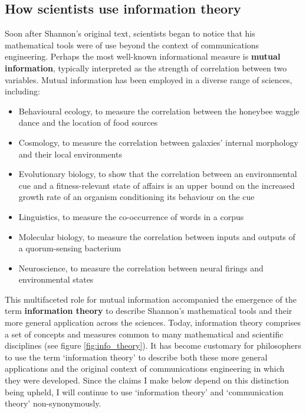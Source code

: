 \documentclass[12pt]{article}
\begin{document}
\subsection{How scientists use information theory}\label{subsec:scientists}

Soon after Shannon's original text, scientists began to notice that his mathematical tools were of use beyond the context of communications engineering.
Perhaps the most well-known informational measure is \textbf{mutual information}, typically interpreted as the strength of correlation between two variables.
Mutual information has been employed in a diverse range of sciences, including:

\begin{itemize}
    \item Behavioural ecology, to measure the correlation between the honeybee waggle dance and the location of food sources \citep{haldane1954statistical}
    \item Cosmology, to measure the correlation between galaxies' internal morphology and their local environments \citep{pandey2017how}
    \item Evolutionary biology, to show that the correlation between an environmental cue and a fitness-relevant state of affairs is an upper bound on the increased growth rate of an organism conditioning its behaviour on the cue \citep{donaldson-matasci2010fitness}
    \item Linguistics, to measure the co-occurrence of words in a corpus \citep[$\S$4]{hunston2002corpora}
    \item Molecular biology, to measure the correlation between inputs and outputs of a quorum-sensing bacterium \citep{mehta2009information}
    \item Neuroscience, to measure the correlation between neural firings and environmental states \citep[][and references therein]{rathkopf2017neural}
\end{itemize}

\noindent This multifaceted role for mutual information accompanied the emergence of the term \textbf{information theory} to describe Shannon's mathematical tools and their more general application across the sciences.
Today, information theory comprises a set of concepts and measures common to many mathematical and scientific disciplines (see figure \ref{fig:info_theory}).
It has become customary for philosophers to use the term `information theory' to describe both these more general applications and the original context of communications engineering in which they were developed.
Since the claims I make below depend on this distinction being upheld, I will continue to use `information theory' and `communication theory' non-synonymously.
\end{document}
